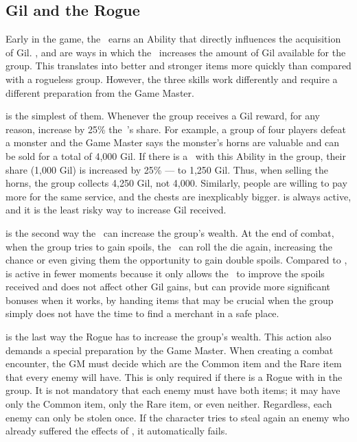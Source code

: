 \begin{multicols}{2}
\subsection{Gil and the Rogue}\label{subsec:inv-rogue}
Early in the game, the~ earns an Ability that directly influences the acquisition of Gil. ,  and  are ways in which the~ increases the amount of Gil available for the group. This translates into better and stronger items more quickly than compared with a rogueless group. However, the three skills work differently and require a different preparation from the Game Master.

 is the simplest of them. Whenever the group receives a Gil reward, for any reason, increase by 25\% the~’s share. For example, a group of four players defeat a monster and the Game Master says the monster’s horns are valuable and can be sold for a total of 4,000 Gil. If there is a~ with this Ability in the group, their share (1,000 Gil) is increased by 25\% --- to 1,250 Gil. Thus, when selling the horns, the group collects 4,250 Gil, not 4,000. Similarly, people are willing to pay more for the same service, and the chests are inexplicably bigger.  is always active, and it is the least risky way to increase Gil received.

\begin{center}
\end{center}

 is the second way the~ can increase the group’s wealth. At the end of combat, when the group tries to gain spoils, the~ can roll the die again, increasing the chance or even giving them the opportunity to gain double spoils. Compared to ,  is active in fewer moments because it only allows the~ to improve the spoils received and does not affect other Gil gains, but can provide more significant bonuses when it works, by handing items that may be crucial when the group simply does not have the time to find a merchant in a safe place.

 is the last way the Rogue has to increase the group’s wealth. This action also demands a special preparation by the Game Master. When creating a combat encounter, the GM must decide which are the Common item and the Rare item that every enemy will have. This is only required if there is a Rogue with  in the group. It is not mandatory that each enemy must have both items; it may have only the Common item, only the Rare item, or even neither. Regardless, each enemy can only be stolen once. If the character tries to steal again an enemy who already suffered the effects of , it automatically fails.


\end{multicols}

